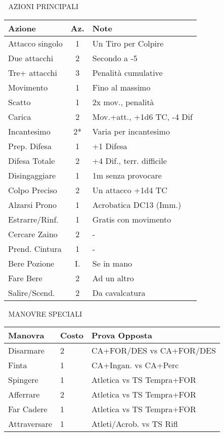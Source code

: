 \documentclass[10pt,a4paper,landscape]{article}
\begin{document}
\begin{multicols}{4}
		\begin{mainsection}{📜 AZIONI PRINCIPALI}
			{\small
				\begin{tabular}{@{}p{2cm}cp{3cm}@{}}
					\toprule
					\textbf{Azione} & \textbf{Az.} & \textbf{Note} \\
					\midrule
					Attacco singolo & 1 & Un Tiro per Colpire \\
					Due attacchi & 2 & Secondo a -5 \\
					Tre+ attacchi & 3 & Penalità cumulative \\
					\midrule
					Movimento & 1 & Fino al massimo \\
					Scatto & 1 & 2x mov., penalità \\
					Carica & 2 & Mov.+att., +1d6 TC, -4 Dif \\
					\midrule
					Incantesimo & 2* & Varia per incantesimo \\
					Prep. Difesa & 1 & +1 Difesa \\
					Difesa Totale & 2 & +4 Dif., terr. difficile \\
					Disingaggiare & 1 & 1m senza provocare \\
					Colpo Preciso & 2 & Un attacco +1d4 TC \\
					\midrule
					Alzarsi Prono & 1 & Acrobatica DC13 (Imm.) \\
					Estrarre/Rinf. & 1 & Gratis con movimento \\
					Cercare Zaino & 2 & - \\
					Prend. Cintura & 1 & - \\
					\midrule
					Bere Pozione & I. & Se in mano \\
					Fare Bere & 2 & Ad un altro \\
					Salire/Scend. & 2 & Da cavalcatura \\
					\bottomrule
				\end{tabular}
			}
		\end{mainsection}

		\begin{mainsection}{🤺 MANOVRE SPECIALI}
			\begin{tabular}{@{}p{1.7cm}p{0.8cm}p{3cm}@{}}
				\toprule
				\textbf{Manovra} & \textbf{Costo} & \textbf{Prova Opposta} \\
				\midrule
				Disarmare & 2 & CA+FOR/DES vs CA+FOR/DES \\
				Finta & 1 & CA+Ingan. vs CA+Perc \\
				Spingere & 1 & Atletica vs TS Tempra+FOR \\
				Afferrare & 2 & Atletica vs TS Tempra+FOR \\
				Far Cadere & 1 & Atletica vs TS Tempra+FOR \\
				Attraversare & 1 & Atleti/Acrob. vs TS Rifl \\
				\bottomrule
			\end{tabular}


\end{mainsection}
\end{multicols}
\end{document}
